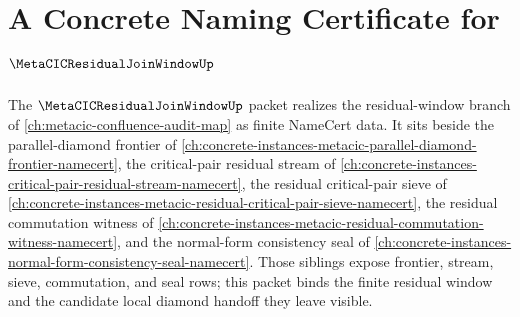 \chapter{A Concrete Naming Certificate for $\MetaCICResidualJoinWindowUp$}
\label{ch:concrete-instances-metacic-residual-join-window-namecert}

The $\MetaCICResidualJoinWindowUp$ packet realizes the residual-window branch of \autoref{ch:metacic-confluence-audit-map} as finite NameCert data. It sits beside the parallel-diamond frontier of \autoref{ch:concrete-instances-metacic-parallel-diamond-frontier-namecert}, the critical-pair residual stream of \autoref{ch:concrete-instances-critical-pair-residual-stream-namecert}, the residual critical-pair sieve of \autoref{ch:concrete-instances-metacic-residual-critical-pair-sieve-namecert}, the residual commutation witness of \autoref{ch:concrete-instances-metacic-residual-commutation-witness-namecert}, and the normal-form consistency seal of \autoref{ch:concrete-instances-normal-form-consistency-seal-namecert}. Those siblings expose frontier, stream, sieve, commutation, and seal rows; this packet binds the finite residual window and the candidate local diamond handoff they leave visible.

